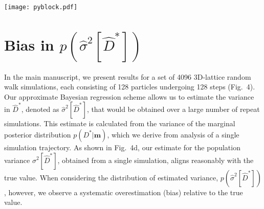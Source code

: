 \documentclass[reprint,superscriptaddress,nobibnotes,amsmath,amssymb,aps,prx,hidelinks]{revtex4-2}
\newcommand{\oMSDi}{\ensuremath{x_i}}
\newcommand{\model}{\bm{m}}
\newcommand{\prob}[1]{\ensuremath{p(#1)}}
\newcommand{\Dest}{\ensuremath{\widehat{D}^*}}
\newcommand{\D}{\ensuremath{D^*}}
\newcommand{\var}[1]{\ensuremath{\sigma^2[#1]}}
\newcommand{\varest}[1]{\ensuremath{\widehat{\sigma}^2[#1]}}
\begin{document}
\begin{figure*}[tb]
  \centering
\texttt{[image: pyblock.pdf]}
    \caption{\label{fig:pyblock_comparison}(Panels (a) and (c)) Probability distributions of point-estimates $\prob{\D}$ obtained from \num{4096} individual random-walk simulations. Panel (a) shows data obtained using variance rescaling to estimated the variances, $\varest{\oMSDi}$, used to parametrise the model covariance matrix, $\mathbf{\Sigma^\prime}$. Panel (b) shows data obtained using block renormalisation to estimate the variances, $\varest{\oMSDi}$, used to parametrise the model covariance matrix.
    The grey lines show the distribution of point estimates, $\prob{\Dest}$, obtained using Bayesian regression with a mean vector and numerical covariance matrix derived from the complete dataset of all \num{4096} simulations. 
    The pink horizontal bar shows an interval of one standard deviation in $\prob{\Dest}$. 
    Panels (b) and (d) show the corresponding  probability distributions of estimated variances, $\varest{\Dest}$, 
    for individual random-walk simulations, compared to the true sample variances obtained using each method (pink vertical lines) 
    $\var{\Dest}$.
    }
\end{figure*}


\section{Bias in $\prob{\varest{\Dest}}$}
\label{sec:bias}
In the main manuscript, we present results for a set of \num{4096} 3D-lattice random walk simulations, each consisting of \num{128} particles undergoing \num{128} steps (Fig.~4).
Our approximate Bayesian regression scheme allows us to estimate the variance in $\Dest$, denoted as $\varest{\Dest}$, that would be obtained over a large number of repeat simulations.
This estimate is calculated from the variance of the marginal posterior distribution $\prob{\D|\model}$, which we derive from analysis of a single simulation trajectory.
As shown in Fig.~4d, our estimate for the population variance $\var{\Dest}$, obtained from a single simulation, aligns reasonably with the true value.
When considering the distribution of estimated variance, $\prob{\varest{\Dest}}$, however, we observe a systematic overestimation (bias) relative to the true value.
\end{document}
